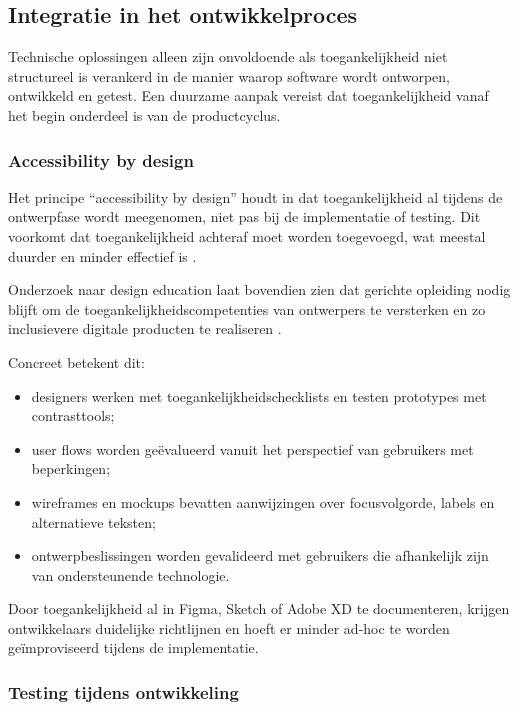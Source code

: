 \subsection{Integratie in het ontwikkelproces}
\label{subsec:integratie-ontwikkelproces}

Technische oplossingen alleen zijn onvoldoende als toegankelijkheid niet structureel is verankerd in de manier waarop software wordt ontworpen, ontwikkeld en getest. Een duurzame aanpak vereist dat toegankelijkheid vanaf het begin onderdeel is van de productcyclus.

\subsubsection{Accessibility by design}
\label{subsubsec:accessibility-by-design}

Het principe ``accessibility by design'' houdt in dat toegankelijkheid al tijdens de ontwerpfase wordt meegenomen, niet pas bij de implementatie of testing. Dit voorkomt dat toegankelijkheid achteraf moet worden toegevoegd, wat meestal duurder en minder effectief is \autocite{Teran2021}.

Onderzoek naar design education laat bovendien zien dat gerichte opleiding nodig blijft om de toegankelijkheidscompetenties van ontwerpers te versterken en zo inclusievere digitale producten te realiseren \autocite{McCarthy2025}.

Concreet betekent dit:

\begin{itemize}
    \item designers werken met toegankelijkheidschecklists en testen prototypes met contrasttools;
    \item user flows worden geëvalueerd vanuit het perspectief van gebruikers met beperkingen;
    \item wireframes en mockups bevatten aanwijzingen over focusvolgorde, labels en alternatieve teksten;
    \item ontwerpbeslissingen worden gevalideerd met gebruikers die afhankelijk zijn van ondersteunende technologie.
\end{itemize}

Door toegankelijkheid al in Figma, Sketch of Adobe XD te documenteren, krijgen ontwikkelaars duidelijke richtlijnen en hoeft er minder ad-hoc te worden geïmproviseerd tijdens de implementatie.

\subsubsection{Testing tijdens ontwikkeling}
\label{subsubsec:testing-tijdens-dev}

